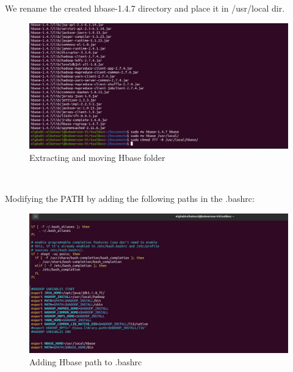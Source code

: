 \begin{spacing}{1.2}
\par We rename the created hbase-1.4.7 directory and place it in /usr/local dir.
\\
\begin{figure}[!htb] 
\begin{center} 
\includegraphics[width=1\linewidth]{Pictures/HBase/Configuring Hbase in Standalone & Pseudo-distributed mode/Installing and Configuring Apache Hbase/Extracting and moving Hbase folder} 
\end{center} 
\caption{Extracting and moving Hbase folder} 
\end{figure}  \FloatBarrier
\\
\newpage
\par Modifying the PATH by adding the following paths in the .bashrc:
\\
\begin{figure}[!htb] 
\begin{center} 
\includegraphics[width=1\linewidth]{Pictures/HBase/Configuring Hbase in Standalone & Pseudo-distributed mode/Installing and Configuring Apache Hbase/Adding Hbase path to .bashrc} 
\end{center} 
\caption{Adding Hbase path to .bashrc} 
\end{figure}  \FloatBarrier
\\


\end{spacing}
